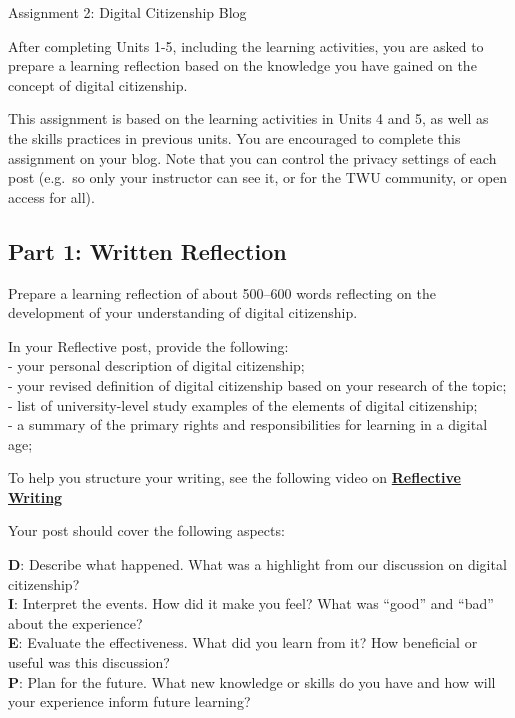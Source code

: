 \documentclass[
]{book}
\theoremstyle{definition}
\theoremstyle{definition}
\theoremstyle{definition}
\theoremstyle{definition}
\theoremstyle{remark}
\begin{document}
\begin{assessment}
{Assignment 2: Digital Citizenship Blog}

After completing Units 1-5, including the learning activities, you are asked to prepare a learning reflection based on the knowledge you have gained on the concept of digital citizenship.

This assignment is based on the learning activities in Units 4 and 5, as well as the skills practices in previous units. You are encouraged to complete this assignment on your blog. Note that you can control the privacy settings of each post (e.g.~so only your instructor can see it, or for the TWU community, or open access for all).

\hypertarget{part-1-written-reflection}{%
\subsection*{Part 1: Written Reflection}\label{part-1-written-reflection}}

Prepare a learning reflection of about 500--600 words reflecting on the development of your understanding of digital citizenship.

In your Reflective post, provide the following:\\
- your personal description of digital citizenship;\\
- your revised definition of digital citizenship based on your research of the topic;\\
- list of university-level study examples of the elements of digital citizenship;\\
- a summary of the primary rights and responsibilities for learning in a digital age;

To help you structure your writing, see the following video on \href{https://www.youtube.com/watch?v=SntBj0FIApw}{\textbf{Reflective Writing}}

Your post should cover the following aspects:

\textbf{D}: Describe what happened. What was a highlight from our discussion on digital citizenship?\\
\textbf{I}: Interpret the events. How did it make you feel? What was ``good'' and ``bad'' about the experience?\\
\textbf{E}: Evaluate the effectiveness. What did you learn from it? How beneficial or useful was this discussion?\\
\textbf{P}: Plan for the future. What new knowledge or skills do you have and how will your experience inform future learning?


\end{assessment}
\end{document}
